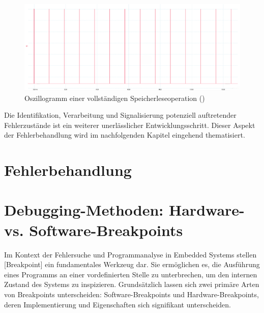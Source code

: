 \begin{figure}[h!]
	\centering
	\includegraphics[width=1.0\textwidth]{../Bilder/BA_MSP430_Observer_Zeitmessungen/ReadMem_Complete_zoomed_rdm_0x1C00_13.png}
	\caption{Oszillogramm einer vollst\"andigen Speicherleseoperation ()}
	\label{fig:zeichenorientiertes_lesen}
\end{figure}

Die Identifikation, Verarbeitung und Signalisierung potenziell auftretender Fehlerzust\"ande ist ein weiterer unerl\"asslicher Entwicklungsschritt. Dieser Aspekt der Fehlerbehandlung wird im nachfolgenden Kapitel eingehend thematisiert.\AI

\newpage
\section{Fehlerbehandlung}
\label{Fehlerbehandlung}




\newpage
\section{Debugging-Methoden: Hardware- vs. Software-Breakpoints}
\label{Hardware_VS_Software_Breakpoints}

Im Kontext der Fehlersuche und Programmanalyse in Embedded Systems stellen [Breakpoint] ein fundamentales Werkzeug dar. Sie erm\"oglichen es, die Ausf\"uhrung eines Programms an einer vordefinierten Stelle zu unterbrechen, um den internen Zustand des Systems zu inspizieren. Grunds\"atzlich lassen sich zwei prim\"are Arten von Breakpoints unterscheiden: Software-Breakpoints und Hardware-Breakpoints, deren Implementierung und Eigenschaften sich signifikant unterscheiden.

